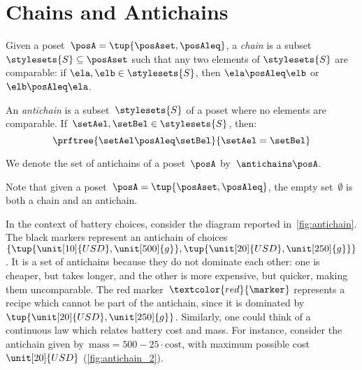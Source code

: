 

\section{Chains and Antichains}
\label{sec:chains-antichains}

\begin{definition}
    \label{def:chain}
    Given a poset~$\posA = \tup{\posAset, \posAleq}$, a \emph{chain} is a subset~$\stylesets{S} \subseteq \posAset$ such that any two elements of $\stylesets{S}$ are comparable: if $\ela, \elb \in \stylesets{S}$, then $\ela \posAleq \elb$ or $\elb \posAleq \ela$.
\end{definition}


\begin{definition}
    \label{def:antichain}
    An \emph{antichain} is a subset~$\stylesets{S}$ of a poset where no elements are comparable.
    If~$\setAel,\setBel \in \stylesets{S}$, then:
    \begin{equation}
        \prftree{\setAel \posAleq \setBel}{\setAel=\setBel}
    \end{equation}
\end{definition}

We denote the set of antichains of a poset~$\posA$ by~$\antichains\posA$.

\begin{remark}
    Note that given a poset~$\posA=\tup{\posAset,\posAleq}$, the empty set~$\emptyset$ is both a chain and an antichain.
\end{remark}


In the context of battery choices, consider the diagram reported in~\cref{fig:antichain}.
The black markers represent an antichain of choices~$\{\tup{\unit[10]{USD},\unit[500]{g}},\tup{\unit[20]{USD},\unit[250]{g}}\}$.
It is a set of antichains because they do not dominate each other:
one is cheaper, but takes longer, and the other is more expensive, but quicker, making them uncomparable.
The red marker~$\textcolor{red}{\marker}$ represents a recipe which cannot be part of the antichain, since it is dominated by~$\tup{\unit[20]{USD},\unit[250]{g}}$.
Similarly, one could think of a continuous law which relates battery cost and mass.
For instance, consider the antichain given by~$\text{mass}=500-25\cdot \text{cost}$, with maximum possible cost~$\unit[20]{USD}$ (\cref{fig:antichain_2}).

